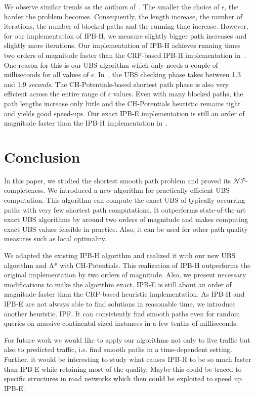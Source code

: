 \documentclass[a4paper,UKenglish,cleveref, autoref, thm-restate]{lipics-v2021}
\begin{document}
We observe similar trends as the authors of~\cite{dss-tarrn-18}.
The smaller the choice of $\epsilon$, the harder the problem becomes.
Consequently, the length increase, the number of iterations, the number of blocked paths and the running time increase.
However, for our implementation of IPB-H, we measure slightly bigger path increases and slightly more iterations.
Our implementation of IPB-H achieves running times two orders of magnitude faster than the CRP-based IPB-H implementation in~\cite{dss-tarrn-18}.
One reason for this is our UBS algorithm which only needs a couple of milliseconds for all values of $\epsilon$.
In~\cite{dss-tarrn-18}, the UBS checking phase takes between 1.3 and 1.9 \emph{seconds}.
The CH-Potentials-based shortest path phase is also very efficient across the entire range of $\epsilon$ values.
Even with many blocked paths, the path lengths increase only little and the CH-Potentials heuristic remains tight and yields good speed-ups.
Our exact IPB-E implementation is still an order of magnitude faster than the IPB-H implementation in~\cite{dss-tarrn-18}.

\section{Conclusion}

In this paper, we studied the shortest smooth path problem and proved its $\mathcal{NP}$-completeness.
We introduced a new algorithm for practically efficient UBS computation.
This algorithm can compute the exact UBS of typically occurring paths with very few shortest path computations.
It outperforms state-of-the-art exact UBS algorithms by around two orders of magnitude and makes computing exact UBS values feasible in practice.
Also, it can be used for other path quality measures such as local optimality.

We adapted the existing IPB-H algorithm and realized it with our new UBS algorithm and A* with CH-Potentials.
This realization of IPB-H outperforms the original implementation by two orders of magnitude.
Also, we present necessary modifications to make the algorithm exact.
IPB-E is still about an order of magnitude faster than the CRP-based heuristic implementation.
As IPB-H and IPB-E are not always able to find solutions in reasonable time, we introduce another heuristic, IPF.
It can consistently find smooth paths even for random queries on massive continental sized instances in a few tenths of milliseconds.

For future work we would like to apply our algorithms not only to live traffic but also to predicted traffic, i.e. find smooth paths in a time-dependent setting.
Further, it would be interesting to study what causes IPB-H to be so much faster than IPB-E while retaining most of the quality.
Maybe this could be traced to specific structures in road networks which then could be exploited to speed up IPB-E.
\end{document}
